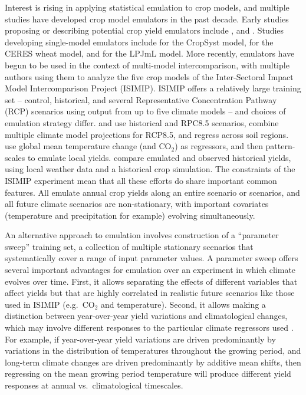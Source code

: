 \documentclass[gmd, manuscript]{copernicus} %
\begin{document}
Interest is rising in applying statistical emulation to crop models, and multiple studies have developed crop model emulators in the past decade.
Early studies proposing or describing potential crop yield emulators include \citet{Howden2005, raisen2006, Lobell2010}, and \citet{Ferrise2011}.
Studies developing single-model emulators include  \citet{Holzkamper2012} for the CropSyst model, \citet{RUANE2013a} for the CERES wheat model, and \citet{Oyebamiji15} for the LPJmL model. 
More recently, emulators have begun to be used in the context of multi-model intercomparison, with multiple authors \citep{BLANC2015, BLANC2017, Ostberg2018, Mistry2017}  using them to analyze the five crop models  of the Inter-Sectoral Impact Model Intercomparison Project (ISIMIP). ISIMIP offers a relatively large training set --  control, historical, and several Representative Concentration Pathway (RCP) scenarios using output from up to five climate models \citep{Warszawski3228, Frieler2017} -- and choices of emulation strategy differ.
\citet{BLANC2015} and \citet{BLANC2017} use historical and RPC8.5 scenarios, combine multiple climate model projections for RCP8.5, and regress across soil regions. 
\citet{Ostberg2018} use global mean temperature change (and CO$_2$) as regressors, and then pattern-scales to emulate local yields. 
\citet{Mistry2017} compare emulated and observed historical yields, using local weather data and a historical crop simulation. 
The constraints of the ISIMIP experiment mean that all these efforts do share important common features. 
All emulate annual crop yields along an entire scenario or scenarios, and all future climate scenarios are non-stationary, with important covariates (temperature and precipitation for example) evolving simultaneously. 

An alternative approach to emulation involves construction of a ``parameter sweep'' training set, a collection of multiple stationary scenarios that systematically cover a range of input parameter values.
A parameter sweep offers several important advantages for emulation over an experiment in which climate evolves over time. 
First, it allows separating the effects of different variables that affect yields but that are highly correlated in realistic future scenarios like those used in ISIMIP (e.g.\ CO$_2$ and temperature). 
Second, it allows making a distinction between year-over-year yield variations and climatological changes, which may involve different responses to the particular climate regressors used \citep[e.g.][]{Ruane2016}. 
For example, if year-over-year yield variations are driven predominantly by variations in the distribution of temperatures throughout the growing period, and long-term climate changes are driven predominantly by additive mean shifts, then regressing on the mean growing period temperature will produce different yield responses at annual vs.\ climatological timescales.  
\end{document}
